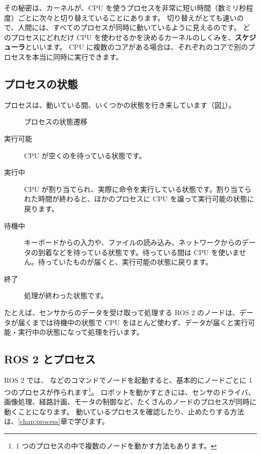 その秘密は、カーネルが、CPU を使うプロセスを非常に短い時間（数ミリ秒程度）ごとに次々と切り替えていることにあります。
切り替えがとても速いので、人間には、すべてのプロセスが同時に動いているように見えるのです。
どのプロセスにどれだけ CPU を使わせるかを決めるカーネルのしくみを、\textbf{スケジューラ}といいます。
CPU に複数のコアがある場合は、それぞれのコアで別のプロセスを本当に同時に実行できます。

\subsection{プロセスの状態}

プロセスは、動いている間、いくつかの状態を行き来しています（図\ref{fig:linux-internals-process-state}）。

\begin{figure}[tb]
  \centering
  
  \caption{プロセスの状態遷移}
  \label{fig:linux-internals-process-state}
\end{figure}

\begin{description}
  \item[実行可能] CPU が空くのを待っている状態です。
  \item[実行中] CPU が割り当てられ、実際に命令を実行している状態です。割り当てられた時間が終わると、ほかのプロセスに CPU を譲って実行可能の状態に戻ります。
  \item[待機中] キーボードからの入力や、ファイルの読み込み、ネットワークからのデータの到着などを待っている状態です。待っている間は CPU を使いません。待っていたものが届くと、実行可能の状態に戻ります。
  \item[終了] 処理が終わった状態です。
\end{description}

たとえば、センサからのデータを受け取って処理する ROS 2 のノードは、データが届くまでは待機中の状態で CPU をほとんど使わず、データが届くと実行可能・実行中の状態になって処理を行います。

\subsection{ROS 2 とプロセス}

ROS 2 では、 などのコマンドでノードを起動すると、基本的にノードごとに 1 つのプロセスが作られます\footnote{1 つのプロセスの中で複数のノードを動かす方法もあります。}。
ロボットを動かすときには、センサのドライバ、画像処理、経路計画、モータの制御など、たくさんのノードのプロセスが同時に動くことになります。
動いているプロセスを確認したり、止めたりする方法は、\ref{chap:process}章で学びます。

